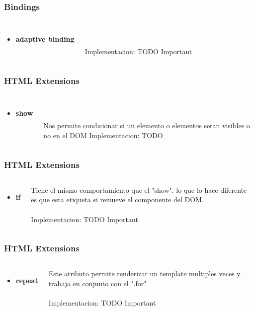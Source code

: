\documentclass{beamer}
\begin{document}
\begin{frame}
\frametitle{Bindings}
\begin{columns}[c]
\begin{itemize}
\item \textbf{adaptive binding}
\end{itemize}

\\~\\
Implementacion: TODO Important
\end{columns}
\end{frame}
\begin{frame}
\frametitle{HTML Extensions}
\begin{columns}[c]
\begin{itemize}
\item \textbf{show}
\end{itemize}

\\~\\
Nos permite condicionar si un elemento o elementos seran visibles o no en el DOM
Implementacion: TODO
\end{columns}
\end{frame}
\begin{frame}
\frametitle{HTML Extensions}
\begin{columns}[c]
\begin{itemize}
\item \textbf{if}
\end{itemize}

Tiene el mismo comportamiento que el "show". lo que lo hace diferente es que esta etiqueta si remueve el componente del DOM.
\\~\\
Implementacion: TODO Important
\end{columns}
\end{frame}
\begin{frame}
\frametitle{HTML Extensions}
\begin{columns}[c]
\begin{itemize}
\item \textbf{repeat}
\end{itemize}

Este atributo permite renderizar un template multiples veces y trabaja en conjunto con el ".for"
\\~\\
Implementacion: TODO Important
\end{columns}
\end{frame}
\end{document}
